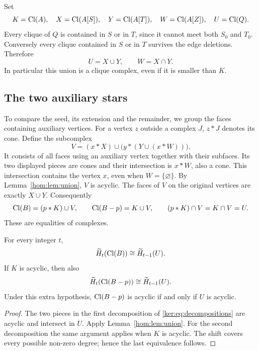 Set
\[
 K=\operatorname{Cl}(A),\quad X=\operatorname{Cl}(A[S]),\quad Y=\operatorname{Cl}(A[T]),\quad
 W=\operatorname{Cl}(A[Z]),\quad U=\operatorname{Cl}(Q).
\]
Every clique of \(Q\) is contained in \(S\) or in \(T\), since it
cannot meet both \(S_0\) and \(T_0\). Conversely every clique contained
in \(S\) or in \(T\) survives the edge deletions. Therefore
\begin{equation}\label{ker:eq:kernel}
 U=X\cup Y,\qquad W=X\cap Y.
\end{equation}
In particular this union is a clique complex, even if it is smaller
than \(K\).

\subsection{The two auxiliary stars}

To compare the seed, its extension and the remainder, we group the faces containing auxiliary vertices. For a vertex \(z\) outside a complex \(J\), \(z*J\) denotes its cone.
Define the subcomplex
\begin{equation}\label{ker:eq:V}
 V=(x*X)\cup\bigl(y*(Y\cup(x*W))\bigr).
\end{equation}
It consists of all faces using an auxiliary vertex together with
their subfaces. Its two displayed pieces are cones and their
intersection is \(x*W\), also a cone. This intersection contains
the vertex \(x\), even when \(W=\{\varnothing\}\).
By Lemma~\ref{hom:lem:union}, \(V\) is acyclic.
The faces of \(V\) on the original vertices are exactly \(X\cup Y\).
Consequently
\begin{equation}\label{ker:eq:decompositions}
 \operatorname{Cl}(B)=(p*K)\cup V,\qquad
 \operatorname{Cl}(B-p)=K\cup V,\qquad
 (p*K)\cap V=K\cap V=U.
\end{equation}
These are equalities of complexes.

\begin{proposition}\label{ker:prop:global}
For every integer \(t\),
\[
 \widetilde H_t(\operatorname{Cl}(B))\cong\widetilde H_{t-1}(U).
\]
If \(K\) is acyclic, then also
\[
 \widetilde H_t(\operatorname{Cl}(B-p))\cong\widetilde H_{t-1}(U).
\]
Under this extra hypothesis, \(\operatorname{Cl}(B-p)\) is acyclic if and only if
\(U\) is acyclic.
\end{proposition}
\begin{proof}
The two pieces in the first decomposition of
\eqref{ker:eq:decompositions} are acyclic and intersect in \(U\).
Apply Lemma~\ref{hom:lem:union}. For the second decomposition the same
argument applies when \(K\) is acyclic. The shift covers every
possible non-zero degree; hence the last equivalence follows.
\end{proof}

